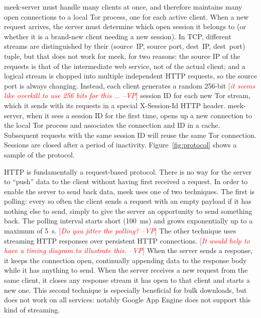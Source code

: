 \documentclass{sig-alternate}
\newcommand{\meekserver}{\mbox{meek-server}\xspace}
\newcommand{\meek}{meek\xspace}
\newcommand{\note}[1]{{\textcolor{red}{[\textit{#1}]}}}
\newcommand{\vp}[1]{\note{#1 --VP}}
\begin{document}
\meekserver must handle many clients at once,
and therefore maintains many open connections to a local Tor process,
one for each active client.
When a new request arrives, the server must determine which
open session it belongs to
(or whether it is a brand-new client needing a new session).
In TCP, different streams are distinguished by their
(source~IP, source port, dest~IP, dest~port) tuple,
but that does not work for \meek, for two reasons:
the source IP of the requests is that of the intermediate web service,
not of the actual client;
and a logical stream is chopped into multiple independent HTTP requests,
so the source port is always changing.
Instead, each client generates a random 256-bit
\vp{it seems like overkill to use 256 bits for this $\ldots$}
session ID for each new Tor stream,
which it sends with its requests in a special
\mbox{X-Session-Id} HTTP header.
\meekserver, when it sees a session ID for the first time,
opens up a new connection to the local Tor process
and associates the connection and ID in a cache.
Subsequent requests with the
same session ID will reuse the same Tor connection.
Sessions are closed after a period of inactivity.
Figure~\ref{fig:protocol} shows a sample of the protocol.

HTTP is fundamentally a request-based protocol.
There is no way for the server to ``push'' data to the client without
having first received a request.
In order to enable the server to send back data,
\meek uses one of two techniques.
The first is polling:
every so often the client sends a request with an empty payload
if it has nothing else to send,
simply to give the server an opportunity to send something back.
The polling interval starts short (100~ms) and grows exponentially
up to a maximum of 5~s.  \vp{Do you jitter the polling?}
The other technique
uses streaming HTTP responses over persistent HTTP connections.
\vp{It would help to have a timing diagram to illustrate this.}
When the server sends a response, it keeps the connection open,
continually appending data to the response body while it has anything to send.
When the server receives a new request from the same client,
it closes any response stream it has open to that client and starts a new one.
This second technique is especially beneficial for bulk downloads,
but does not work on all services:
notably Google App Engine does not support this kind of streaming.
\end{document}

